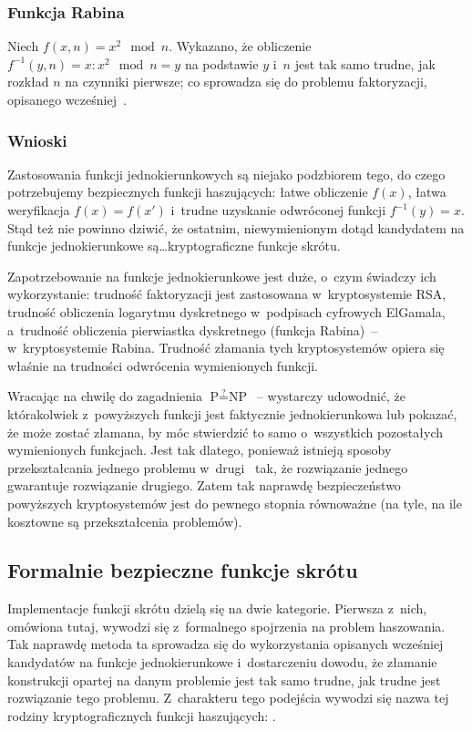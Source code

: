 \subsubsection{Funkcja Rabina}
Niech $f(x,n) = x^2 \mod n$. Wykazano, że obliczenie $f^{-1}(y,n) = x : x^2
\mod n = y$ na podstawie $y$ i~$n$ jest tak samo trudne, jak rozkład $n$ na
czynniki pierwsze; co sprowadza się do problemu faktoryzacji, opisanego
wcześniej~\cite{gregg2003factoring}.



\subsubsection{Wnioski}
Zastosowania funkcji jednokierunkowych są niejako podzbiorem tego, do czego
potrzebujemy bezpiecznych funkcji haszujących: łatwe obliczenie $f(x)$, łatwa
weryfikacja $f(x)=f(x')$ i~trudne uzyskanie odwróconej funkcji $f^{-1}(y)=x$.
Stąd też nie powinno dziwić, że ostatnim, niewymienionym dotąd kandydatem na
funkcje jednokierunkowe są\ldots kryptograficzne funkcje skrótu.

Zapotrzebowanie na funkcje jednokierunkowe jest duże, o~czym świadczy ich
wykorzystanie: trudność faktoryzacji jest zastosowana w~kryptosystemie RSA,
trudność obliczenia logarytmu dyskretnego w~podpisach cyfrowych ElGamala,
a~trudność obliczenia pierwiastka dyskretnego (funkcja Rabina)~--
w~kryptosystemie Rabina. Trudność złamania tych kryptosystemów opiera się
właśnie na trudności odwrócenia wymienionych funkcji.

Wracając na chwilę do zagadnienia $\textrm{P} \stackrel{?}{=} \textrm{NP}$~--
wystarczy udowodnić, że którakolwiek z~powyższych funkcji jest faktycznie
jednokierunkowa lub pokazać, że może zostać złamana, by móc stwierdzić to samo
o~wszystkich pozostałych wymienionych funkcjach. Jest tak dlatego, ponieważ
istnieją sposoby przekształcania jednego problemu
w~drugi~\cite{gregg2003factoring,bach1984discrete} tak, że rozwiązanie jednego
gwarantuje rozwiązanie drugiego. Zatem tak naprawdę bezpieczeństwo powyższych
kryptosystemów jest do pewnego stopnia równoważne (na tyle, na ile kosztowne są
przekształcenia problemów).



\pagebreak
\subsection{Formalnie bezpieczne funkcje skrótu}
Implementacje funkcji skrótu dzielą się na dwie kategorie. Pierwsza z~nich,
omówiona tutaj, wywodzi się z~formalnego spojrzenia na problem haszowania. Tak
naprawdę metoda ta sprowadza się do wykorzystania opisanych wcześniej
kandydatów na funkcje jednokierunkowe i~dostarczeniu dowodu, że złamanie
konstrukcji opartej na danym problemie jest tak samo trudne, jak trudne jest
rozwiązanie tego problemu. Z~charakteru tego podejścia wywodzi się nazwa tej
rodziny kryptograficznych funkcji haszujących: .

